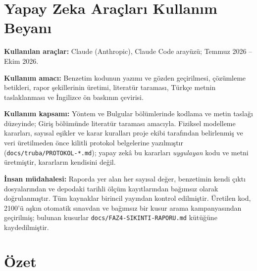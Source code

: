 \documentclass[12pt,a4paper]{article}
\begin{document}

\section*{Yapay Zeka Araçları Kullanım Beyanı}

\noindent\textbf{Kullanılan araçlar:} Claude (Anthropic), Claude Code
arayüzü; Temmuz 2026 -- Ekim 2026.

\noindent\textbf{Kullanım amacı:} Benzetim kodunun yazımı ve gözden
geçirilmesi, çözümleme betikleri, rapor şekillerinin üretimi, literatür
taraması, Türkçe metnin taslaklanması ve İngilizce ön baskının çevirisi.

\noindent\textbf{Kullanım kapsamı:} Yöntem ve Bulgular bölümlerinde
kodlama ve metin taslağı düzeyinde; Giriş bölümünde literatür taraması
amacıyla. Fiziksel modelleme kararları, sayısal eşikler ve karar kuralları
proje ekibi tarafından belirlenmiş ve veri üretilmeden önce kilitli
protokol belgelerine yazılmıştır
(\texttt{docs/truba/PROTOKOL-*.md}); yapay zekâ bu kararları
\emph{uygulayan} kodu ve metni üretmiştir, kararların kendisini değil.

\noindent\textbf{İnsan müdahalesi:} Raporda yer alan her sayısal değer,
benzetimin kendi çıktı dosyalarından ve depodaki tarihli ölçüm
kayıtlarından bağımsız olarak doğrulanmıştır. Tüm kaynaklar birincil
yayından kontrol edilmiştir. Üretilen kod, 2100'ü aşkın otomatik sınavdan
ve bağımsız bir kusur arama kampanyasından geçirilmiş; bulunan kusurlar
\texttt{docs/FAZ4-SIKINTI-RAPORU.md} kütüğüne kaydedilmiştir.

\section*{Özet}
\end{document}
